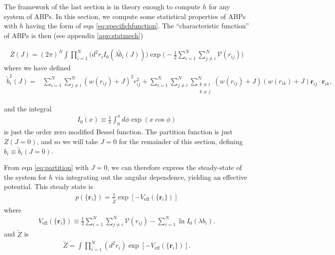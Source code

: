 \documentclass[twocolumn,amsmath,amssymb,aps]{revtex4-1}%
\begin{document}
The framework of the last section is in theory enough to compute $h$ for any
system of ABPs. In this section, we compute some statistical properties of
ABPs with $h$ having the form of eqn \ref{eq:specifichfunction}.
The ``characteristic function'' of ABPs is then (see appendix
\ref{app:statmech})
\begin{widetext}
  \begin{align}\label{eq:partition}
    Z(J) =(2\pi)^N\int\prod_{i=1}^N\big(d^2r_iI_0(\lambda \tilde{b}_i(J)))
    \exp\bigg(-\frac{1}{2}\sum_{i=1}^N\sum_{j\neq i}^N
    \mathcal{V}(r_{ij})\bigg)
  \end{align}
  where we have defined
  \begin{align}\label{eq:b_i2}
    \tilde{b}_i^2(J)
    =&\sum_{i=1}^N\sum_{j\neq i}^N(w(r_{ij})+J)^2r_{ij}^2
    +\sum_{i=1}^N\sum_{j\neq i}^N\sum_{\substack{k\neq i \\ k\neq j}}^N
    (w(r_{ij})+J)(w(r_{ik})+J)\bm{r}_{ij}\cdot\bm{r}_{ik},
  \end{align}
\end{widetext}
and the integral
\begin{align}\label{eq:Iintegral}
  I_0(x)\equiv\frac{1}{\pi}\int_0^{\pi}d\phi\exp(x\cos\phi)
\end{align}
is just the order zero modified Bessel function. The partition function
is just $Z(J=0)$, and so we will take $J=0$ for the remainder of this
section, defining $b_i\equiv \tilde{b}_i(J=0)$.

From eqn \ref{eq:partition} with $J=0$, we can therefore express the
steady-state of the system for $h$ via integrating out the angular
dependence, yielding an effective potential. This steady state is
\begin{align}
  p(\{\bm{r}_i\})=\frac{1}{\tilde{Z}}\exp[-V_{\mathrm{eff}}
  (\{\bm{r}_i\})]
\end{align}
where
\begin{align}
  V_{\mathrm{eff}}(\{\bm{r}_i\})
  \equiv\frac{1}{2}\sum_{i=1}^N\sum_{j\neq i}^N
  \mathcal{V}(r_{ij})-\sum_{i=1}^N\ln I_0(\lambda b_i).
\end{align}
and $\tilde{Z}$ is 
\begin{align}
  \tilde{Z}=\int\prod_{i=1}^N(d^2r_i)\exp[-V_{\mathrm{eff}}(\{\bm{r}_i\})].
\end{align}
\end{document}
